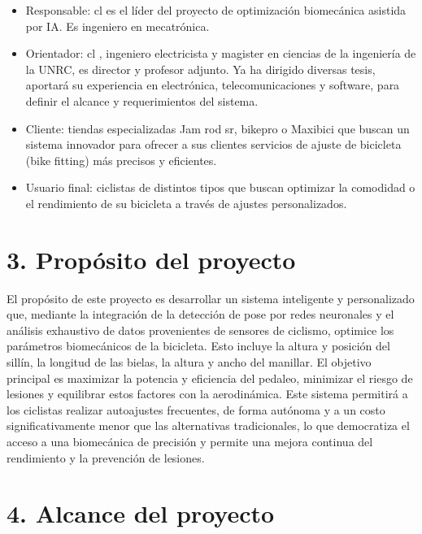 \documentclass[
11pt, %
]{charter}
\begin{document}
\begin{itemize}

\item Responsable: cl \authorname  es el líder del proyecto de optimización biomecánica asistida por IA. Es ingeniero en mecatrónica.

\item Orientador: cl \supname	, ingeniero electricista y magister en ciencias de la ingeniería de la UNRC, es director y profesor adjunto. Ya ha dirigido diversas tesis, aportará su experiencia en electrónica, telecomunicaciones y software, para definir el alcance y requerimientos del sistema.
\item Cliente: tiendas especializadas Jam rod sr, bikepro o Maxibici que buscan un sistema innovador para ofrecer a sus clientes servicios de ajuste de bicicleta (bike fitting) más precisos y eficientes.

\item Usuario final: ciclistas de distintos tipos que buscan optimizar la comodidad o el rendimiento de su bicicleta a través de ajustes personalizados.
\end{itemize}



\section{3. Propósito del proyecto}
\label{sec:proposito}
El propósito de este proyecto es desarrollar un sistema inteligente y personalizado que, mediante la integración de la detección de pose por redes neuronales y el análisis exhaustivo de datos provenientes de sensores de ciclismo, optimice los parámetros biomecánicos de la bicicleta. Esto incluye la altura y posición del sillín, la longitud de las bielas, la altura y ancho del manillar. El objetivo principal es maximizar la potencia y eficiencia del pedaleo, minimizar el riesgo de lesiones y equilibrar estos factores con la aerodinámica.
Este sistema permitirá a los ciclistas realizar autoajustes frecuentes, de forma autónoma y a un costo significativamente menor que las alternativas tradicionales, lo que democratiza el acceso a una biomecánica de precisión y permite una mejora continua del rendimiento y la prevención de lesiones.

\section{4. Alcance del proyecto}
\label{sec:alcance}
\end{document}
